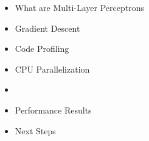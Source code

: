\begin{frame}
\begin{itemize}
    \item What are Multi-Layer Perceptrons
    \item Gradient Descent
    \item Code Profiling
    \item CPU Parallelization
    \item \textbf{\color{red}{GPU Parallelization}}
    \item Performance Results
    \item Next Steps
\end{itemize}
\end{frame}


